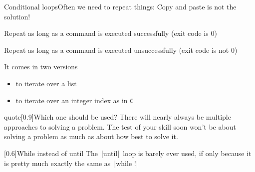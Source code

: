 
\begin{frame}{Conditional loops}{Often we need to repeat things: Copy and paste is not the solution!}
    \vspace{-1mm}
    \begin{description}
        \item[\texttt{while}] Repeat as long as a command is executed successfully (exit code is 0)
        \item[\texttt{until}] Repeat as long as a command is executed unsuccessfully (exit code is not 0)
        \item[\texttt{for}] It comes in two versions
                            \begin{itemize}
                                \item to iterate over a list
                                \item to iterate over an integer index as in \texttt{C}
                            \end{itemize}
    \end{description}
    \begin{varblock}{quote}[0.9\textwidth]{Which one should be used?}
        There will nearly always be multiple approaches to solving a problem.
        The test of your skill soon won't be about solving a problem as much as about how best to solve it.
    \end{varblock}
    \begin{varblock}{}[0.6\textwidth]{While instead of until}
        The \,\bash|until|\, loop is barely ever used, if only because it is pretty much exactly the same as \,\bash|while !|
    \end{varblock}
\end{frame}
